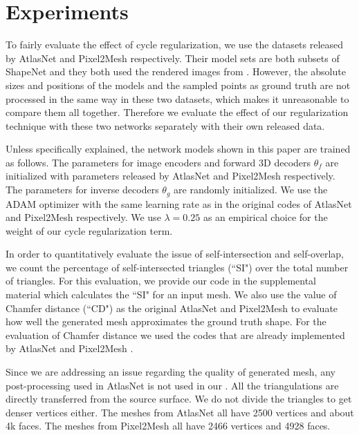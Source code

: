 \section{Experiments}
 To fairly evaluate the effect of cycle regularization, we use the datasets released by AtlasNet and Pixel2Mesh respectively. Their model sets are both subsets of ShapeNet \cite{shapenetdata} and they both used the rendered images from \cite{3DR2N2} . However, the absolute sizes and positions of the models and the sampled points as ground truth are not processed in the same way in these two datasets, which makes it unreasonable to compare them all together. Therefore we evaluate the effect of our regularization technique with these two networks separately with their own released data.

Unless specifically explained, the network models shown in this paper are trained as follows. The parameters for image encoders and forward 3D decoders $\theta_f$ are initialized with parameters released by AtlasNet \cite{atlasnet} and Pixel2Mesh \cite{pixel2mesh} respectively. The parameters for inverse decoders $\theta_g$ are randomly initialized. We use the ADAM \cite{adam} optimizer with the same learning rate as in the original codes of AtlasNet and Pixel2Mesh respectively. We use $\lambda=0.25$ as an empirical choice for the weight of our cycle regularization term.

In order to quantitatively evaluate the issue of self-intersection and self-overlap, we count the percentage of self-intersected triangles (``SI") over the total number of triangles. For this evaluation, we provide our code in the supplemental material which calculates the ``SI" for an input mesh.  
We also use the value of Chamfer distance (``CD") as the original AtlasNet and Pixel2Mesh to evaluate how well the generated mesh approximates the ground truth shape. For the evaluation of Chamfer distance we used the codes that are already implemented by AtlasNet \cite{atlasnet} and Pixel2Mesh \cite{pixel2mesh}.

 Since we are addressing an issue regarding the quality of generated mesh, any post-processing used in AtlasNet \cite{atlasnet} is not used in our . All the triangulations are directly transferred from the source surface. We do not divide the triangles to get denser vertices either. The meshes from AtlasNet all have 2500 vertices and about 4k faces. The meshes from Pixel2Mesh all have 2466 vertices and 4928 faces.

